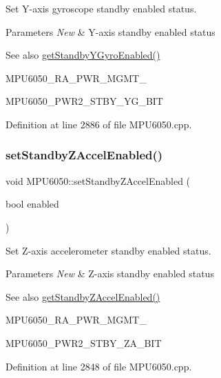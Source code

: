 Set Y-\/axis gyroscope standby enabled status. 


\begin{DoxyParams}{Parameters}
{\em New} & Y-\/axis standby enabled status \\
\hline
\end{DoxyParams}
\begin{DoxySeeAlso}{See also}
\mbox{\hyperlink{classMPU6050_aaad2985f8d22aec123f1e1dabcdd427a}{get\+Standby\+Y\+Gyro\+Enabled()}} 

M\+P\+U6050\+\_\+\+R\+A\+\_\+\+P\+W\+R\+\_\+\+M\+G\+M\+T\+\_ 

M\+P\+U6050\+\_\+\+P\+W\+R2\+\_\+\+S\+T\+B\+Y\+\_\+\+Y\+G\+\_\+\+B\+IT 
\end{DoxySeeAlso}


Definition at line 2886 of file M\+P\+U6050.\+cpp.

\mbox{\label{classMPU6050_ac5fd917549d2ed0f12b8a17167271199}} 
\subsubsection{\texorpdfstring{setStandbyZAccelEnabled()}{setStandbyZAccelEnabled()}}
{\footnotesize\ttfamily void M\+P\+U6050\+::set\+Standby\+Z\+Accel\+Enabled (\begin{DoxyParamCaption}\item[{bool}]{enabled }\end{DoxyParamCaption})}



Set Z-\/axis accelerometer standby enabled status. 


\begin{DoxyParams}{Parameters}
{\em New} & Z-\/axis standby enabled status \\
\hline
\end{DoxyParams}
\begin{DoxySeeAlso}{See also}
\mbox{\hyperlink{classMPU6050_adae85612e047c4c7f0c3b7110fc92956}{get\+Standby\+Z\+Accel\+Enabled()}} 

M\+P\+U6050\+\_\+\+R\+A\+\_\+\+P\+W\+R\+\_\+\+M\+G\+M\+T\+\_ 

M\+P\+U6050\+\_\+\+P\+W\+R2\+\_\+\+S\+T\+B\+Y\+\_\+\+Z\+A\+\_\+\+B\+IT 
\end{DoxySeeAlso}


Definition at line 2848 of file M\+P\+U6050.\+cpp.

